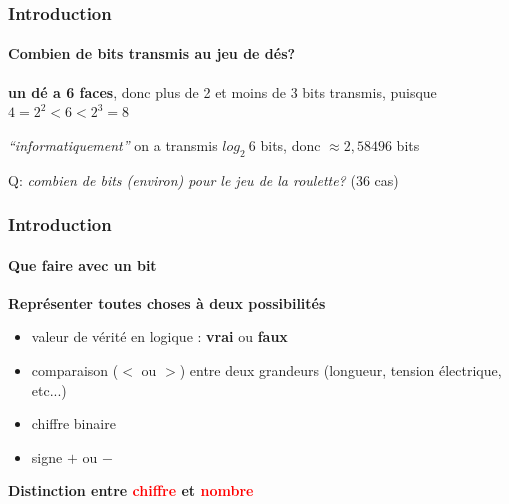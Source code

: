 \documentclass[xcolor=svgnames,final,smaller,a4]{beamer}
\begin{document}
\begin{frame}
  \frametitle{Introduction}
  \framesubtitle{Combien de bits transmis au jeu de dés?}
  
  \textbf{un dé a 6 faces}, donc plus de 2 et moins de 3 bits transmis, puisque
  $4 = 2^2 < 6 < 2^3 = 8$

  \vspace{1cm}

  \emph{``informatiquement''} on a transmis $log_2~ 6$ bits, donc $\approx 2,58496$ bits

  \vspace{1cm}

  Q: \textit{combien de bits (environ) pour le jeu de la roulette?} (36 cas)
  
\end{frame}

\begin{frame}
  \frametitle{Introduction}
  \framesubtitle{Que faire avec un bit}

  
  \textbf{Représenter toutes choses à deux possibilités}
  
  \begin{itemize}

  \item valeur de vérité en logique : \textbf{vrai} ou \textbf{faux}

  \item comparaison ($<$ ou $>$) entre deux grandeurs (longueur, tension électrique, etc...)
  \item chiffre binaire

    \item signe $+$ ou $-$
  \end{itemize}

  \vspace{1cm}

  \textbf{Distinction entre \textcolor{red}{chiffre} et \textcolor{red}{nombre}}
\end{frame}
\end{document}
